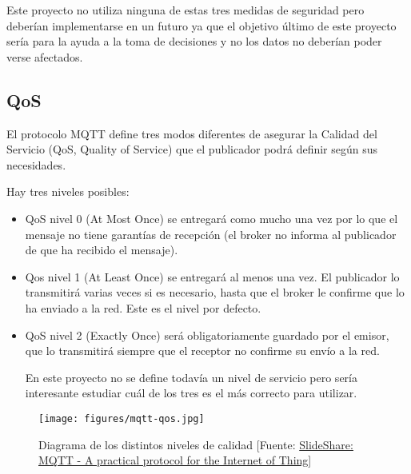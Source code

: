 Este proyecto no utiliza ninguna de estas tres medidas de seguridad pero deberían implementarse en un futuro ya que el objetivo último de este proyecto sería para la ayuda a la toma de decisiones y no los datos no deberían poder verse afectados.

\subsection{QoS}
El protocolo MQTT define tres modos diferentes de asegurar la Calidad del Servicio (QoS, Quality of Service) que el publicador podrá definir según sus necesidades.

Hay tres niveles posibles:
\begin{itemize}
\item QoS nivel 0 (At Most Once) se entregará como mucho una vez por lo que el mensaje no tiene garantías de recepción (el broker no informa al publicador de que ha recibido el mensaje).

\item Qos nivel 1 (At Least Once) se entregará al menos una vez. El publicador lo transmitirá varias veces si es necesario, hasta que el broker le confirme que lo ha enviado a la red. Este es el nivel por defecto.

\item QoS nivel 2 (Exactly Once) será obligatoriamente guardado por el emisor, que lo transmitirá siempre que el receptor no confirme su envío a la red.

En este proyecto no se define todavía un nivel de servicio pero sería interesante estudiar cuál de los tres es el más correcto para utilizar.
\end{itemize}

\begin{figure}[htb]
	\begin{center}
		\texttt{[image: figures/mqtt-qos.jpg]}
		\caption{Diagrama de los distintos niveles de calidad [Fuente: \href{https://image.slidesharecdn.com/0xwitjksqnqruoz4tnsi-signature-6a256d24caf5d1fcc6a3bf1d013dfe0e1fa99369a560d140998f50cbdbc6d127-poli-140828123252-phpapp02/95/mqtt-a-practical-protocol-for-the-internet-of-things-15-638.jpg?cb=1409229409}{SlideShare: MQTT - A practical protocol for the Internet of Thing}] \label{qos}}
	\end{center}
\end{figure}
